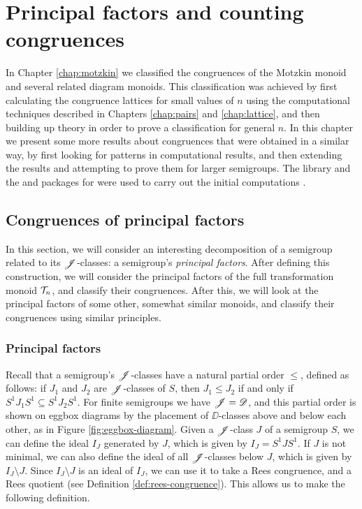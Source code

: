 \chapter{Principal factors and counting congruences}
\label{chap:other}

In Chapter \ref{chap:motzkin} we classified the congruences of the Motzkin
monoid and several related diagram monoids.  This classification was achieved by
first calculating the congruence lattices for small values of $n$ using the
computational techniques described in Chapters \ref{chap:pairs} and
\ref{chap:lattice}, and then building up theory in order to prove a
classification for general $n$.  In this chapter we present some more results
about congruences that were obtained in a similar way, by first looking for
patterns in computational results, and then extending the results and attempting
to prove them for larger semigroups.  The \libsemigroups{} library and the
\Semigroups{} and \smallsemi{} packages for \GAP{} were used to carry out the
initial computations \cite{libsemigroups, semigroups, smallsemi, gap}.

\section{Congruences of principal factors}
\label{sec:princfact}

In this section, we will consider an interesting decomposition of a semigroup
related to its $\mathrel{\mathscr{J}}$-classes: a semigroup's \textit{principal factors}.  After
defining this construction, we will consider the principal factors of the full
transformation monoid $\mathcal{T}_n$, and classify their congruences.  After this, we
will look at the principal factors of some other, somewhat similar monoids, and
classify their congruences using similar principles.

\subsection{Principal factors}
\label{sec:princfact-def}

Recall that a semigroup's $\mathrel{\mathscr{J}}$-classes have a natural partial order $\leq$,
defined as follows: if $J_1$ and $J_2$ are $\mathrel{\mathscr{J}}$-classes of $S$, then
$J_1 \leq J_2$ if and only if $S^1 J_1 S^1 \subseteq S^1 J_2 S^1$.  For finite
semigroups we have $\mathscr{J}=\mathscr{D}$, and this partial order is shown on eggbox diagrams
by the placement of $\DD$-classes above and below each other, as in Figure
\ref{fig:eggbox-diagram}.  Given a $\mathrel{\mathscr{J}}$-class $J$ of a semigroup $S$, we can
define the ideal $I_J$ generated by $J$, which is given by $I_J = S^1 J S^1$.
If $J$ is not minimal, we can also define the ideal of all $\mathrel{\mathscr{J}}$-classes below
$J$, which is given by $I_J \setminus J$.  Since $I_J \setminus J$ is an ideal
of $I_J$, we can use it to take a Rees congruence, and a Rees quotient (see
Definition \ref{def:rees-congruence}).  This allows us to make the following
definition.

